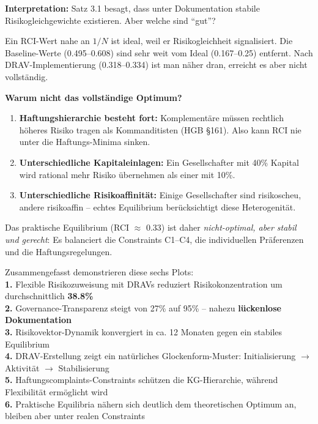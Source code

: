 \documentclass[a4paper, 12pt, twoside, openright]{report}
\theoremstyle{definition}
\theoremstyle{definition}
\begin{document}
\medskip
\noindent\textbf{Interpretation:} Satz 3.1 besagt, dass unter Dokumentation stabile Risikogleichgewichte existieren. Aber welche sind ``gut''?
 
Ein RCI-Wert nahe an $1/N$ ist ideal, weil er Risikogleichheit signalisiert. Die Baseline-Werte (0.495--0.608) sind sehr weit vom Ideal (0.167--0.25) entfernt. Nach DRAV-Implementierung (0.318--0.334) ist man näher dran, erreicht es aber nicht vollständig.
 
\textbf{Warum nicht das vollständige Optimum?}
\begin{enumerate}
    \item \textbf{Haftungshierarchie besteht fort:} Komplementäre müssen rechtlich höheres Risiko tragen als Kommanditisten (HGB \S 161). Also kann RCI nie unter die Haftungs-Minima sinken.
    \item \textbf{Unterschiedliche Kapitaleinlagen:} Ein Gesellschafter mit 40\% Kapital wird rational mehr Risiko übernehmen als einer mit 10\%.
    \item \textbf{Unterschiedliche Risikoaffinität:} Einige Gesellschafter sind risikoscheu, andere risikoaffin -- echtes Equilibrium berücksichtigt diese Heterogenität.
\end{enumerate}
 
Das praktische Equilibrium (RCI $\approx$ 0.33) ist daher \emph{nicht-optimal, aber stabil und gerecht}: Es balanciert die Constraints C1--C4, die individuellen Präferenzen und die Haftungsregelungen.
 
 
Zusammengefasst demonstrieren diese sechs Plots:\\
\textbf{1.} Flexible Risikozuweisung mit DRAVs reduziert Risikokonzentration um durchschnittlich \textbf{38.8\%} \\[0.3cm]
\textbf{2.} Governance-Transparenz steigt von 27\% auf 95\% -- nahezu \textbf{lückenlose Dokumentation} \\[0.3cm]
\textbf{3.} Risikovektor-Dynamik konvergiert in ca. 12 Monaten gegen ein stabiles Equilibrium \\[0.3cm]
\textbf{4.} DRAV-Erstellung zeigt ein natürliches Glockenform-Muster: Initialisierung $\to$ Aktivität $\to$ Stabilisierung \\[0.3cm]
\textbf{5.} Haftungscomplaints-Constraints schützen die KG-Hierarchie, während Flexibilität ermöglicht wird \\[0.3cm]
\textbf{6.} Praktische Equilibria nähern sich deutlich dem theoretischen Optimum an, bleiben aber unter realen Constraints
 
\end{document}
